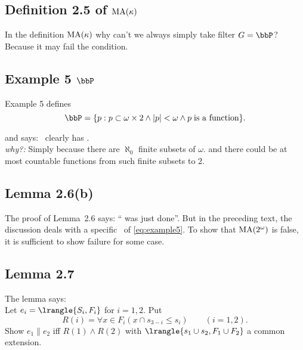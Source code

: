 \subsection{Definition 2.5 of \(\mathop{\rm MA}\nolimits(\kappa)\)}

In the definition \(\mathop{\rm MA}\nolimits(\kappa)\)
why can't we always simply take filter \(G=\bbP\)?\\
Because it may fail the  condition.

\subsection{Example 5 \(\bbP\)}

Example 5 defines
\begin{equation} \label{eq:example5}
\bbP = \{p: p \subset \omega\times 2 \land |p|<\omega 
  \land p \;\textnormal{is a function}\}.
\end{equation}

and says: \bbP\ clearly has \ccc. \\
\emph{why?:} Simply because there are \(\aleph_0\) finite subsets of \(\omega\).
and there could be at most countable functions from 
such finite subsets to $2$.

\subsection{Lemma 2.6(b)}

The proof of Lemma~2.6 says: `` was just done''.
But in the preceding text, the discussion deals with 
a specific \bbP\ of \eqref{eq:example5}.
To show that \(\mathop{\rm MA}\nolimits(2^\omega)\) is false, it is sufficient
to show failure for some case.

\subsection{Lemma 2.7}

The lemma says:\\
Let \(e_i=\lrangle{S_i,F_i}\) for \(i=1,2\). Put
\begin{equation*}
R(i) = \forall x\in F_i(x \cap s_{3-i} \leq s_i) \qquad (i=1,2).
\end{equation*}
Show \(e_1\|e_2\) iff \(R(1) \land R(2)\)
with \(\lrangle{s_1\cup s_2,F_1\cup F_2}\) a common extension.

